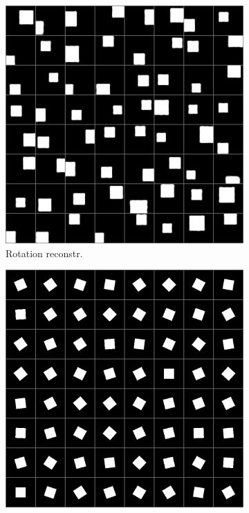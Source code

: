 \documentclass[10pt,a4paper]{article}
\begin{document}
\begin{figure}[!ht]
\begin{subfigure}{0.49\textwidth}
        \includegraphics[width=\textwidth]{square_output1.png}
        \caption{Rotation reconstr.}
        \label{sq_rrec}
    \end{subfigure}
    \begin{subfigure}{0.49\textwidth}
        \centering
        \includegraphics[width=\textwidth] {square_target0.png}

\end{subfigure}
\end{figure}
\end{document}
